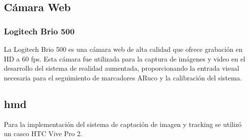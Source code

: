 \subsection{Cámara Web}
\subsubsection{Logitech Brio 500}
La Logitech Brio 500 es una cámara web de alta calidad que ofrece grabación en HD a 60 fps. Esta cámara fue utilizada para la captura de imágenes y video en el desarrollo del sistema de realidad aumentada, proporcionando la entrada visual necesaria para el seguimiento de marcadores ARuco y la calibración del sistema.
\subsection{\acrfull{hmd}}
Para la implementación del sistema de captación de imagen y tracking se utilizó un casco HTC Vive Pro 2.

